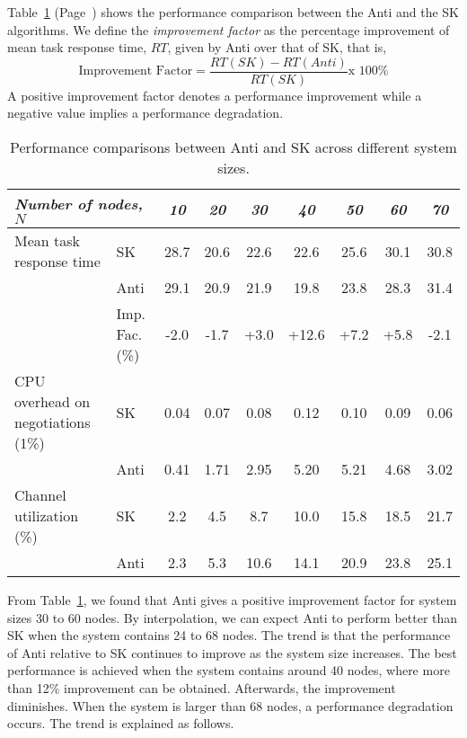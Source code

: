Table~\ref{tab:anti.basic.result_II.sk_vs_anti} 
(Page~\pageref{tab:anti.basic.result_II.sk_vs_anti})
shows the performance comparison between the
{\sc Anti} and the {\sc SK} algorithms.
We define the {\it improvement factor\/} as the percentage
improvement of mean task response time, $RT$,  given by
{\sc Anti} over that of {\sc SK}, that is,
%
\[
	\mbox{Improvement Factor} = \frac {RT({SK}) - RT({Anti})}
				          {RT({SK})}
			            \mbox {x 100\%}
\]
%
A positive improvement factor denotes a performance improvement
while a negative value implies a performance degradation.


\begin{table}[htbp]
\caption {Performance comparisons between 
{\sc Anti} and {\sc SK} across different system sizes.}
\label{tab:anti.basic.result_II.sk_vs_anti}

\begin{center}
\begin{tabular}{p{4.0cm}l*{7}{c}} \hline
%
\multicolumn{2}{l}{\sl Number of nodes, $N$} 
& {\sl 10}& {\sl 20} & {\sl 30} & {\sl 40} & {\sl 50} & {\sl 60} &{\sl 70} \\ 
\hline
%
{Mean task response time} 
& {\sc SK}	& 28.7	& 20.6	& 22.6	& 22.6	& 25.6	& 30.1	& 30.8 \\
& {\sc Anti}	& 29.1	& 20.9	& 21.9	& 19.8	& 23.8	& 28.3	& 31.4 \\ 
\cline{2-9}
%
& Imp. Fac. (\%)& -2.0	& -1.7	& +3.0	& +12.6	& +7.2	& +5.8	& -2.1 \\ 
\hline
%
{CPU overhead on negotiations (1\%)}
& {\sc SK}	& 0.04	& 0.07	& 0.08	& 0.12	& 0.10	& 0.09	& 0.06 \\
& {\sc Anti}	& 0.41	& 1.71	& 2.95	& 5.20	& 5.21	& 4.68	& 3.02 \\ 
\hline
%
{Channel utilization (\%)}
& {\sc SK}	& 2.2	& 4.5	& 8.7	& 10.0	& 15.8	& 18.5	& 21.7 \\
& {\sc Anti}	& 2.3	& 5.3	& 10.6	& 14.1	& 20.9	& 23.8	& 25.1 \\ 
%
\hline
\end{tabular}
\end{center}

\end{table}


From Table~\ref{tab:anti.basic.result_II.sk_vs_anti}, we found that {\sc Anti} 
gives a positive improvement factor for system sizes 30 to 60 nodes.
By interpolation, we can expect {\sc Anti} to perform
better than {\sc SK} when the system contains 24 to 68 nodes.
The trend is that the performance of {\sc Anti} relative to {\sc SK}
continues to improve as the system size increases. 
The best performance is achieved when the system contains around 40 nodes,
where more than 12\% improvement can be obtained.
Afterwards, the improvement diminishes. 
When the system is larger than 68 nodes, a performance degradation occurs.
The trend is explained as follows.

